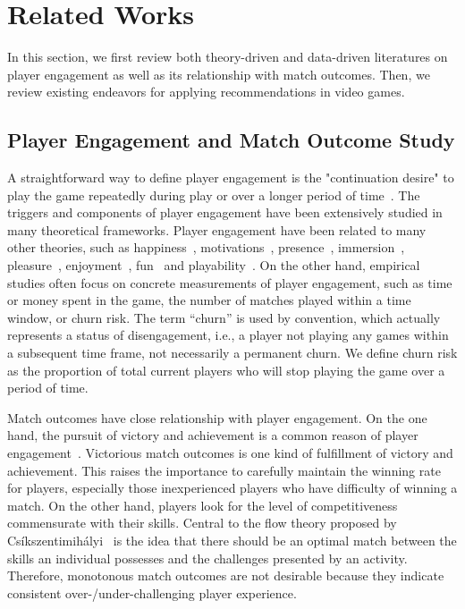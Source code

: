 \chapter{Related Works} %

\label{chapter:relatework} %

In this section, we first review both theory-driven and data-driven literatures on player engagement as well as its relationship with match outcomes. Then, we review existing endeavors for applying recommendations in video games.

\section{ Player Engagement and Match Outcome Study}
A straightforward way to define player engagement is the "continuation desire" to play the game repeatedly during play or over a longer period of time~\cite{schoenau2011player}. The triggers and components of player engagement have been extensively studied in many theoretical frameworks. Player engagement have been related to many other theories, such as happiness~\cite{sweetser2005gameflow,flow1990psychology,chen2007flow}, motivations~\cite{przybylski2010motivational,ryan2006motivational,yee2006demographics,yee2006motivations,sherry2006video}, presence~\cite{lombard1997heart,tamborini2006role}, immersion~\cite{mcmahan2003immersion,brown2004grounded,jennett2008measuring,ermi2005fundamental}, pleasure~\cite{costello2009tool}, enjoyment~\cite{ravaja2007fun,klimmt2003dimensions}, fun~\cite{koster2013theory} and playability~\cite{federoff2003improving,federoff2002heuristics,desurvire2004using,nacke2009playability}. On the other hand, empirical studies often focus on concrete measurements of player engagement, such as time or money spent in the game, the number of matches played within a time window, or churn risk. The term ``churn'' is used by convention, which actually represents a status of disengagement, i.e., a player not playing any games within a subsequent time frame, not necessarily a permanent churn. We define churn risk as the proportion of total current players who will stop playing the game over a period of time. 

Match outcomes have close relationship with player engagement. On the one hand, the pursuit of victory and achievement is a common reason of player engagement~\cite{schoenau2011player,yee2006motivations,sherry2006video,wu2010falling}. Victorious match outcomes is one kind of fulfillment of victory and achievement. This raises the importance to carefully maintain the winning rate for players, especially those inexperienced players who have difficulty of winning a match. On the other hand, players look for the level of competitiveness commensurate with their skills. Central to the flow theory proposed by Cs\'{i}kszentimih\'{a}lyi~\cite{sweetser2005gameflow,flow1990psychology,chen2007flow} is the idea that there should be an optimal match between the skills an individual possesses and the challenges presented by an activity. Therefore, monotonous match outcomes are not desirable because they indicate consistent over-/under-challenging player experience. 

